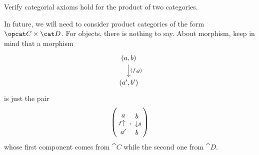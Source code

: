 \begin{exercise}
Verify categorial axioms hold for the product of two categories.
\end{exercise}

In future, we will need to consider product categories of the form \(\opcat C \times \cat D\). For objects, there is nothing to say. About morphism, keep in mind that a morphism
\[\begin{tikzcd} (a, b) \ar["{(f, g)}", d] \\ (a', b')\end{tikzcd}\]
is just the pair
\[\left(\begin{tikzcd}[row sep=small] a \\ a' \ar["f", u] \end{tikzcd}, \begin{tikzcd}[row sep=small] b \ar["g", d] \\ b \end{tikzcd}\right)\]
whose first component comes from \(\cat C\) while the second one from \(\cat D\).
